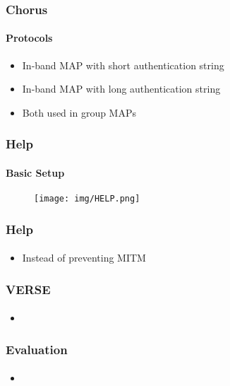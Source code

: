 \documentclass{beamer}
\begin{document}
\begin{frame}
	\frametitle{Chorus}
	\framesubtitle{Protocols}
	\begin{itemize}
		\item In-band MAP with short authentication string
		\item In-band MAP with long authentication string
		\item Both used in group MAPs
	\end{itemize}
\end{frame}

\begin{frame}
	\frametitle{Help}
	\framesubtitle{Basic Setup}
	\begin{figure}
		\texttt{[image: img/HELP.png]}
	\end{figure}
\end{frame}

\begin{frame}
	\frametitle{Help}
	\framesubtitle{}
	\begin{itemize}
		\item Instead of preventing MITM 
	\end{itemize}
\end{frame}

\begin{frame}
	\frametitle{VERSE}
	\framesubtitle{}
	\begin{itemize}
		\item 
	\end{itemize}
\end{frame}

\begin{frame}
	\frametitle{Evaluation}
	\framesubtitle{}
	\begin{itemize}
		\item 
	\end{itemize}
\end{frame}
\end{document}
